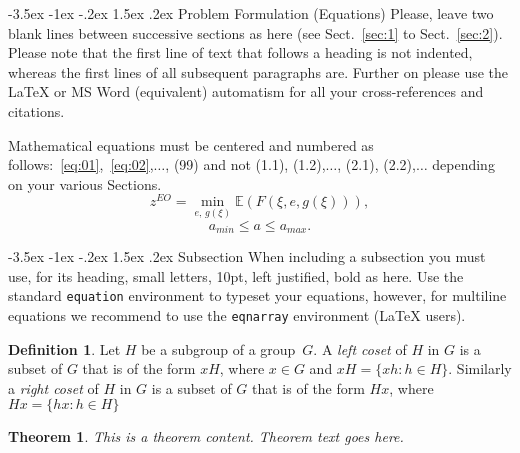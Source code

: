 \documentclass[a4paper,10pt]{article}
\makeatletter
\newtheorem*{theorem}{Theorem}
\theoremstyle{definition}
\newtheorem*{definition}{Definition}
\renewcommand\section{\@startsection {section}{1}{\z@}%
                                   {-3.5ex \@plus -1ex \@minus -.2ex}%
                                   {1.5ex \@plus.2ex}%
                                   {\large\bfseries}}
\renewcommand\subsection{\@startsection {subsection}{1}{\z@}%
                                   {-3.5ex \@plus -1ex \@minus -.2ex}%
                                   {1.5ex \@plus.2ex}%
                                   {\normalsize\bfseries}}
\makeatother
\begin{document}
\section{Problem Formulation (Equations)}
\label{sec:2}
Please, leave two blank lines between successive sections as here (see Sect.~\ref{sec:1} to Sect.~\ref{sec:2}). Please note that the first line of text that follows a heading is not indented, whereas the first lines of all subsequent paragraphs are. Further on please use the
\LaTeX{} or MS Word (equivalent) automatism for all your cross-references and citations.

Mathematical equations must be centered and numbered as follows:~\eqref{eq:01},~\eqref{eq:02},$\ldots$, (99) and not (1.1), (1.2),$\ldots$, (2.1),
(2.2),$\ldots$ depending on your various Sections.
\begin{equation}z^{EO}=\min\limits_{e,\,g(\xi)}\mathbb{E}(F(\xi,e,g(\xi))),
\label{eq:01}
\end{equation}
\begin{equation} a_{min}\leq a\leq a_{max}.
\label{eq:02}
\end{equation}

\subsection{Subsection}
\label{subsec:1}
When including a subsection you must use, for its heading, small
letters, 10pt, left justified, bold as here.
Use the standard \verb|equation| environment to typeset your equations, however, for multiline equations we recommend to use the \verb|eqnarray| environment (\LaTeX{} users).


\begin{definition}
Let $H$ be a subgroup of a group~$G$.  A \emph{left coset}
of $H$ in $G$ is a subset of $G$ that is of the form $xH$,
where $x \in G$ and $xH = \{ xh : h \in H \}$.
Similarly a \emph{right coset} of $H$ in $G$ is a subset
of $G$ that is of the form $Hx$, where
$Hx = \{ hx : h \in H \}$
\end{definition}

\begin{theorem}
This is a theorem content. Theorem text goes here. 
\end{theorem}
\end{document}
